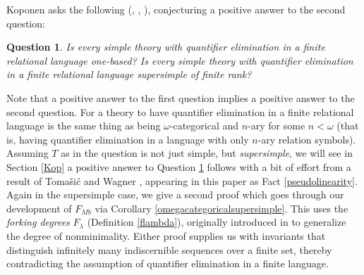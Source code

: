 \documentclass[11pt]{amsart}
\newtheorem{question}[theorem]{Question}
\theoremstyle{definition}
\theoremstyle{remark}
\numberwithin{equation}{section}
\begin{document}
Koponen asks the following (\cite{Kop16}, \cite{Kop19}, \cite{Kop16slides}), conjecturing a positive answer to the second question:

\begin{question} \label{kopQ}
   Is every simple theory with quantifier elimination in a finite relational language one-based? Is every simple theory with quantifier elimination in a finite relational language supersimple of finite rank?
\end{question}

Note that a positive answer to the first question implies a positive answer to the second question. For a theory to have quantifier elimination in a finite relational language is the same thing as being $\omega$-categorical and $n$-ary for some $n < \omega$ (that is, having quantifier elimination in a language with only $n$-ary relation symbols). Assuming $T$ as in the question is not just simple, but \textit{supersimple}, we will see in Section \ref{Kop} a positive answer to Question \ref{kopQ} follows with a bit of effort from a result of Tomašić and Wagner \cite{TW03}, appearing in this paper as Fact \ref{pseudolinearity}. Again in the supersimple case, we give a second proof which goes through our development of $F_{Mb}$ via Corollary \ref{omegacategoricalsupersimple}. This uses the \textit{forking degrees} $F_{\lambda}$ (Definition \ref{flambda}), originally introduced in \cite{oberwolfachFdeg} to generalize the degree of nonminimality. Either proof supplies us with invariants that distinguish infinitely many indiscernible sequences over a finite set, thereby contradicting the assumption of quantifier elimination in a finite language.
\end{document}
